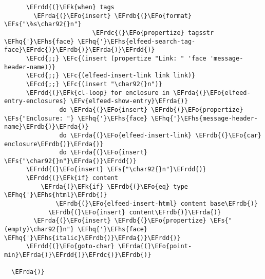 \documentclass[c]{article}
\theoremstyle{plain}%
\theoremstyle{definition}
\theoremstyle{remark}
\newcommand{\EFc}[1]{\textcolor{EFc}{#1}} %
\newcommand{\EFcd}[1]{\textcolor{EFcd}{#1}} %
\newcommand{\EFs}[1]{\textcolor{EFs}{#1}} %
\newcommand{\EFk}[1]{\textcolor{EFk}{#1}} %
\newcommand{\EFv}[1]{\textcolor{EFv}{#1}} %
\newcommand{\EFo}[1]{\textcolor{EFo}{#1}} %
\newcommand{\EFhq}[1]{\textcolor{EFhq}{#1}} %
\newcommand{\EFhs}[1]{\textcolor{EFhs}{#1}} %
\newcommand{\EFrda}[1]{\textcolor{EFrda}{#1}} %
\newcommand{\EFrdb}[1]{\textcolor{EFrdb}{#1}} %
\newcommand{\EFrdc}[1]{\textcolor{EFrdc}{#1}} %
\newcommand{\EFrdd}[1]{\textcolor{EFrdd}{#1}} %
\begin{document}
\begin{Code}
\begin{Verbatim}
      \EFrdd{(}\EFk{when} tags
        \EFrda{(}\EFo{insert} \EFrdb{(}\EFo{format} \EFs{"\%s\char92{}n"}
                        \EFrdc{(}\EFo{propertize} tagsstr \EFhq{'}\EFhs{face} \EFhq{'}\EFhs{elfeed-search-tag-face}\EFrdc{)}\EFrdb{)}\EFrda{)}\EFrdd{)}
      \EFcd{;;} \EFc{(insert (propertize "Link: " 'face 'message-header-name))}
      \EFcd{;;} \EFc{(elfeed-insert-link link link)}
      \EFcd{;;} \EFc{(insert "\char92{}n")}
      \EFrdd{(}\EFk{cl-loop} for enclosure in \EFrda{(}\EFo{elfeed-entry-enclosures} \EFv{elfeed-show-entry}\EFrda{)}
               do \EFrda{(}\EFo{insert} \EFrdb{(}\EFo{propertize} \EFs{"Enclosure: "} \EFhq{'}\EFhs{face} \EFhq{'}\EFhs{message-header-name}\EFrdb{)}\EFrda{)}
               do \EFrda{(}\EFo{elfeed-insert-link} \EFrdb{(}\EFo{car} enclosure\EFrdb{)}\EFrda{)}
               do \EFrda{(}\EFo{insert} \EFs{"\char92{}n"}\EFrda{)}\EFrdd{)}
      \EFrdd{(}\EFo{insert} \EFs{"\char92{}n"}\EFrdd{)}
      \EFrdd{(}\EFk{if} content
          \EFrda{(}\EFk{if} \EFrdb{(}\EFo{eq} type \EFhq{'}\EFhs{html}\EFrdb{)}
              \EFrdb{(}\EFo{elfeed-insert-html} content base\EFrdb{)}
            \EFrdb{(}\EFo{insert} content\EFrdb{)}\EFrda{)}
        \EFrda{(}\EFo{insert} \EFrdb{(}\EFo{propertize} \EFs{"(empty)\char92{}n"} \EFhq{'}\EFhs{face} \EFhq{'}\EFhs{italic}\EFrdb{)}\EFrda{)}\EFrdd{)}
      \EFrdd{(}\EFo{goto-char} \EFrda{(}\EFo{point-min}\EFrda{)}\EFrdd{)}\EFrdc{)}\EFrdb{)}

  \EFrda{)}
\end{Verbatim}
\end{Code}
\end{document}
